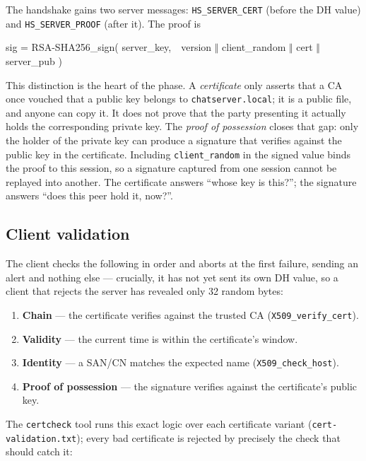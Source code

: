 \documentclass[11pt,a4paper]{article}
\begin{document}
\sloppy
The handshake gains two server messages: \texttt{HS\_SERVER\_CERT} (before the DH value) and
\texttt{HS\_SERVER\_PROOF} (after it). The proof is

\begin{center}\small\ttfamily
sig = RSA-SHA256\_sign( server\_key,\ \ version $\Vert$ client\_random $\Vert$ cert $\Vert$ server\_pub )
\end{center}

This distinction is the heart of the phase. A \emph{certificate} only asserts that a CA once vouched
that a public key belongs to \texttt{chatserver.local}; it is a public file, and anyone can copy it.
It does not prove that the party presenting it actually holds the corresponding private key. The
\emph{proof of possession} closes that gap: only the holder of the private key can produce a signature
that verifies against the public key in the certificate. Including \texttt{client\_random} in the
signed value binds the proof to this session, so a signature captured from one session cannot be
replayed into another. The certificate answers ``whose key is this?''; the signature answers ``does
this peer hold it, now?''.
\fussy

\subsection{Client validation}

The client checks the following in order and aborts at the first failure, sending an alert and nothing
else --- crucially, it has not yet sent its own DH value, so a client that rejects the server has
revealed only 32 random bytes:

\begin{enumerate}[leftmargin=*,itemsep=1pt]
\item \textbf{Chain} --- the certificate verifies against the trusted CA (\texttt{X509\_verify\_cert}).
\item \textbf{Validity} --- the current time is within the certificate's window.
\item \textbf{Identity} --- a SAN/CN matches the expected name (\texttt{X509\_check\_host}).
\item \textbf{Proof of possession} --- the signature verifies against the certificate's public key.
\end{enumerate}

The \texttt{certcheck} tool runs this exact logic over each certificate variant
(\texttt{cert-validation.txt}); every bad certificate is rejected by precisely the check that should
catch it:
\end{document}
